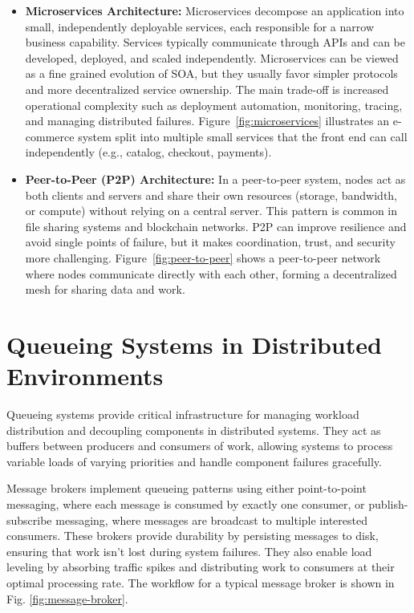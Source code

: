 \begin{itemize}
    

    \item \textbf{Microservices Architecture:} Microservices decompose an application into small, independently deployable services, each responsible for a narrow business capability. Services typically communicate through APIs and can be developed, deployed, and scaled independently. Microservices can be viewed as a fine grained evolution of SOA, but they usually favor simpler protocols and more decentralized service ownership. The main trade-off is increased operational complexity such as deployment automation, monitoring, tracing, and managing distributed failures. Figure~\ref{fig:microservices} illustrates an e-commerce system split into multiple small services that the front end can call independently (e.g., catalog, checkout, payments).
    
    

    \item \textbf{Peer-to-Peer (P2P) Architecture:} In a peer-to-peer system, nodes act as both clients and servers and share their own resources (storage, bandwidth, or compute) without relying on a central server. This pattern is common in file sharing systems and blockchain networks. P2P can improve resilience and avoid single points of failure, but it makes coordination, trust, and security more challenging. Figure~\ref{fig:peer-to-peer} shows a peer-to-peer network where nodes communicate directly with each other, forming a decentralized mesh for sharing data and work.
    
    
\end{itemize}

\section{Queueing Systems in Distributed Environments}
\label{sec:ds-queueing}
Queueing systems provide critical infrastructure for managing workload distribution and decoupling components in distributed systems. They act as buffers between producers and consumers of work, allowing systems to process variable loads of varying priorities and handle component failures gracefully.

Message brokers implement queueing patterns using either point-to-point messaging, where each message is consumed by exactly one consumer, or publish-subscribe messaging, where messages are broadcast to multiple interested consumers. These brokers provide durability by persisting messages to disk, ensuring that work isn't lost during system failures. They also enable load leveling by absorbing traffic spikes and distributing work to consumers at their optimal processing rate. The workflow for a typical message broker is shown in Fig. \ref{fig:message-broker}.

